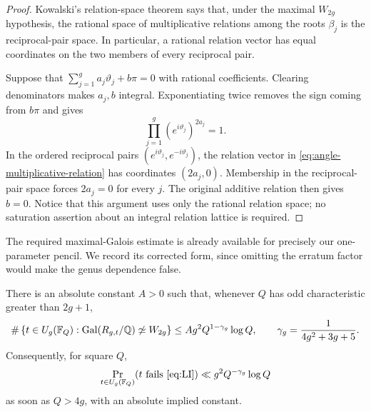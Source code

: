\begin{proof}
Kowalski's relation-space theorem
\cite[Proposition~2.4(2), with \(m=1\)]{Kowalski2008} says that, under the
maximal \(W_{2g}\) hypothesis, the rational space of multiplicative relations
among the roots \(\beta_j\) is the reciprocal-pair space.  In particular, a
rational relation vector has equal coordinates on the two members of every
reciprocal pair.

Suppose that
\(\sum_{j=1}^g a_j\vartheta_j+b\pi=0\) with rational coefficients.  Clearing
denominators makes \(a_j,b\) integral.  Exponentiating twice removes the sign
coming from \(b\pi\) and gives
\begin{equation}
 \prod_{j=1}^g(e^{i\vartheta_j})^{2a_j}=1.
\label{eq:angle-multiplicative-relation}
\end{equation}
In the ordered reciprocal pairs
\((e^{i\vartheta_j},e^{-i\vartheta_j})\), the relation vector in
\eqref{eq:angle-multiplicative-relation} has coordinates \((2a_j,0)\).
Membership in the reciprocal-pair space forces \(2a_j=0\) for every \(j\).
The original additive relation then gives \(b=0\).  Notice that this argument
uses only the rational relation space; no saturation assertion about an
integral relation lattice is required.
\end{proof}

The required maximal-Galois estimate is already available for precisely our
one-parameter pencil.  We record its corrected form, since omitting the
erratum factor would make the genus dependence false.

\begin{proposition}
\label{prop:LI-exceptional-set}
There is an absolute constant \(A>0\) such that, whenever \(Q\) has odd
characteristic greater than \(2g+1\),
\begin{equation}
 \#\left\{t\in U_g(\mathbb F_Q):
   \operatorname{Gal}(R_{g,t}/\mathbb Q)\not\simeq W_{2g}\right\}
 \leq A g^2 Q^{1-\gamma_g}\log Q,
 \qquad
 \gamma_g=\frac1{4g^2+3g+5}.
\label{eq:kowalski-exceptional}
\end{equation}
Consequently, for square \(Q\),
\begin{equation}
 \Pr_{t\in U_g(\mathbb F_Q)}(t\text{ fails \eqref{eq:LI}})
 \ll g^2Q^{-\gamma_g}\log Q
\label{eq:LI-probability-bound}
\end{equation}
as soon as \(Q>4g\), with an absolute implied constant.
\end{proposition}

